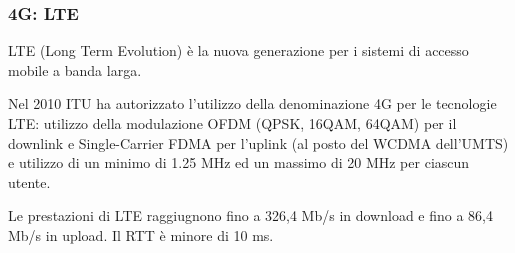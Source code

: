         \subsubsection{4G: LTE}
            LTE (Long Term Evolution) è la nuova generazione per i sistemi di accesso mobile a banda larga.

            Nel 2010 ITU ha autorizzato l'utilizzo della denominazione 4G per le tecnologie LTE: utilizzo della modulazione OFDM (QPSK, 16QAM, 64QAM) per il downlink e Single-Carrier FDMA per l'uplink (al posto del WCDMA dell'UMTS) e utilizzo di un minimo di 1.25 MHz ed un massimo di 20 MHz per ciascun utente.

            Le prestazioni di LTE raggiugnono fino a 326,4 Mb/s in download e fino a 86,4 Mb/s in upload. Il RTT è minore di 10 ms.